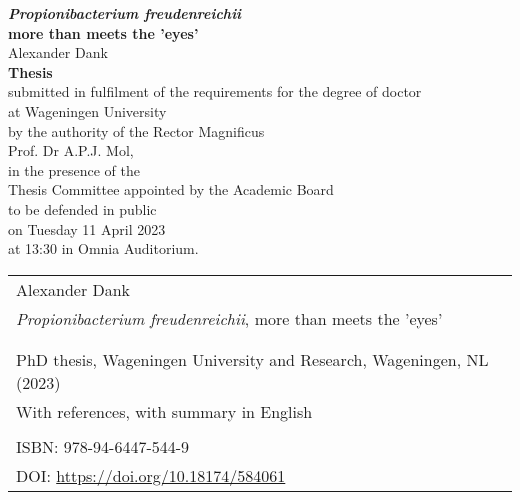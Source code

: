 \newpage
\thispagestyle{empty}
\begin{center}
\Huge{\textbf{\textit{Propionibacterium freudenreichii}}} \\
\Huge{\textbf{more than meets the 'eyes'}} \\
\vspace*{1cm}
\Large{Alexander Dank}\\
\normalsize
\vspace*{\fill}
\textbf{Thesis} \\
submitted in fulfilment of the requirements for the degree of doctor  \\
at Wageningen University\\
by the authority of the Rector Magnificus\\
Prof. Dr A.P.J. Mol,\\
in the presence of the\\
Thesis Committee appointed by the Academic Board\\
to be defended in public\\
on Tuesday 11 April 2023\\
at 13:30 in Omnia Auditorium.\\
\end{center}

\newpage
\thispagestyle{empty}
\vspace*{\fill}
\begin{flushleft}
\begin{tabular}{l}
    Alexander Dank                                                 \\  
    \textit{Propionibacterium freudenreichii}, more than meets the 'eyes'    \\  
                         \\  
                                                             \\  
    PhD thesis, Wageningen University and Research, Wageningen, NL (2023) \\  
    With references, with summary in English                 \\  
                                                             \\  
    ISBN:  978-94-6447-544-9      \\    
    DOI: \url{https://doi.org/10.18174/584061} \\  
\end{tabular}
\end{flushleft}


%